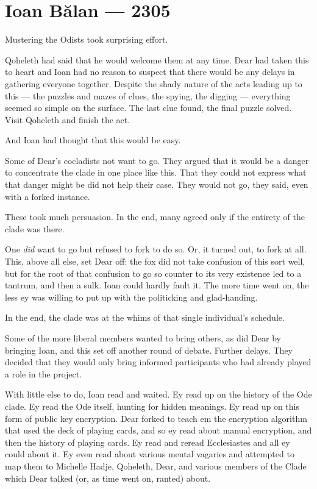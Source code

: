 \hypertarget{ioan-bux103lan-2305}{%
\chapter*{Ioan Bălan — 2305}\label{ioan-bux103lan-2305}}

Mustering the Odists took surprising effort.

Qoheleth had said that he would welcome them at any time. Dear had taken this to heart and Ioan had no reason to suspect that there would be any delays in gathering everyone together. Despite the shady nature of the acts leading up to this — the puzzles and mazes of clues, the spying, the digging — everything seemed so simple on the surface. The last clue found, the final puzzle solved. Visit Qoheleth and finish the act.

And Ioan had thought that this would be easy.

Some of Dear's cocladists not want to go. They argued that it would be a danger to concentrate the clade in one place like this. That they could not express what that danger might be did not help their case. They would not go, they said, even with a forked instance.

These took much persuasion. In the end, many agreed only if the entirety of the clade was there.

One \emph{did} want to go but refused to fork to do so. Or, it turned out, to fork at all. This, above all else, set Dear off: the fox did not take confusion of this sort well, but for the root of that confusion to go so counter to its very existence led to a tantrum, and then a sulk. Ioan could hardly fault it. The more time went on, the less ey was willing to put up with the politicking and glad-handing.

In the end, the clade was at the whims of that single individual's schedule.

Some of the more liberal members wanted to bring others, as did Dear by bringing Ioan, and this set off another round of debate. Further delays. They decided that they would only bring informed participants who had already played a role in the project.

With little else to do, Ioan read and waited. Ey read up on the history of the Ode clade. Ey read the Ode itself, hunting for hidden meanings. Ey read up on this form of public key encryption. Dear forked to teach em the encryption algorithm that used the deck of playing cards, and so ey read about manual encryption, and then the history of playing cards. Ey read and reread Ecclesiastes and all ey could about it. Ey even read about various mental vagaries and attempted to map them to Michelle Hadje, Qoheleth, Dear, and various members of the Clade which Dear talked (or, as time went on, ranted) about.


